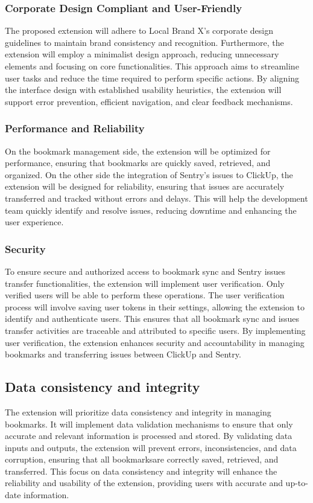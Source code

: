 \subsubsection*{Corporate Design Compliant and User-Friendly}\label{subsec:nf-criteria:design}
The proposed extension will adhere to Local Brand X's corporate design guidelines to maintain brand consistency and recognition. Furthermore, the extension will employ a minimalist design approach, reducing unnecessary elements and focusing on core functionalities. This approach aims to streamline user tasks and reduce the time required to perform specific actions. By aligning the interface design with established usability heuristics, the extension will support error prevention, efficient navigation, and clear feedback mechanisms.

\subsubsection*{Performance and Reliability}\label{subsec:nf-criteria:performance-reliability}
On the bookmark management side, the extension will be optimized for performance, ensuring that bookmarks are quickly saved, retrieved, and organized. On the other side the integration of Sentry's issues to ClickUp, the extension will be designed for reliability, ensuring that issues are accurately transferred and tracked without errors and delays. This will help the development team quickly identify and resolve issues, reducing downtime and enhancing the user experience.

\subsubsection*{Security}\label{subsec:nf-criteria:security}
To ensure secure and authorized access to bookmark sync and Sentry issues transfer functionalities, the extension will implement user verification. Only verified users will be able to perform these operations. The user verification process will involve saving user tokens in their settings, allowing the extension to identify and authenticate users. This ensures that all bookmark sync and issues transfer activities are traceable and attributed to specific users. By implementing user verification, the extension enhances security and accountability in managing bookmarks and transferring issues between ClickUp and Sentry.

\subsection*{Data consistency and integrity}\label{subsec:nf-criteria:data-consistency}
The extension will prioritize data consistency and integrity in managing bookmarks. It will implement data validation mechanisms to ensure that only accurate and relevant information is processed and stored. By validating data inputs and outputs, the extension will prevent errors, inconsistencies, and data corruption, ensuring that all bookmarksare correctly saved, retrieved, and transferred. This focus on data consistency and integrity will enhance the reliability and usability of the extension, providing users with accurate and up-to-date information.